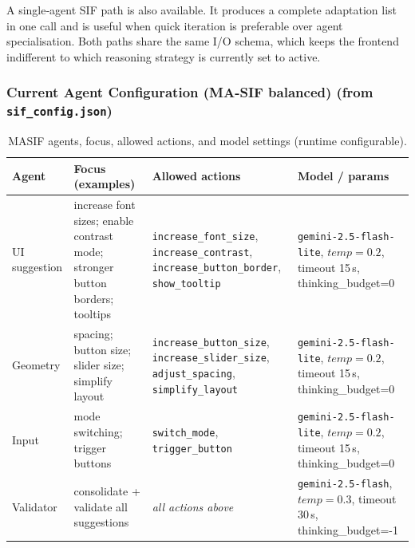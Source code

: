 \documentclass[openany]{book}
\begin{document}
A single‑agent SIF path is also available. It produces a complete adaptation list in one call and is useful when quick iteration is preferable over agent specialisation. Both paths share the same I/O schema, which keeps the frontend indifferent to which reasoning strategy is currently set to active.

\subsubsection*{Current Agent Configuration (MA-SIF balanced) (from \texttt{sif\_config.json})}
\begin{table}[H]
\centering
\begin{tabular}{p{2.1cm}p{4cm}p{4cm}p{4.1cm}}
\toprule
\textbf{Agent} & \textbf{Focus (examples)} & \textbf{Allowed actions} & \textbf{Model / params} \\
\midrule
UI suggestion & increase font sizes; enable contrast mode; stronger button borders; tooltips & \texttt{increase\_font\_size}, \texttt{increase\_contrast}, \texttt{increase\_button\_border}, \texttt{show\_tooltip} & \texttt{gemini-2.5-flash-lite}, $temp{=}0.2$, timeout 15\,s, thinking\_budget=0 \\
Geometry & spacing; button size; slider size; simplify layout & \texttt{increase\_button\_size}, \texttt{increase\_slider\_size}, \texttt{adjust\_spacing}, \texttt{simplify\_layout} & \texttt{gemini-2.5-flash-lite}, $temp{=}0.2$, timeout 15\,s, thinking\_budget=0 \\
Input & mode switching; trigger buttons & \texttt{switch\_mode}, \texttt{trigger\_button} & \texttt{gemini-2.5-flash-lite}, $temp{=}0.2$, timeout 15\,s, thinking\_budget=0 \\
Validator & consolidate + validate all suggestions & \emph{all actions above} & \texttt{gemini-2.5-flash}, $temp{=}0.3$, timeout 30\,s, thinking\_budget=-1 \\
\bottomrule
\end{tabular}
\caption{MA\textendash SIF agents, focus, allowed actions, and model settings (runtime configurable).}
\label{fig:current-agent-configuration}
\end{table}
\end{document}

